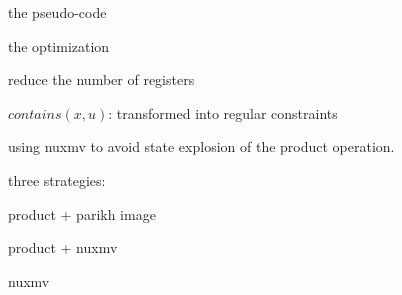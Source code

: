 
the pseudo-code

the optimization

reduce the number of registers

$contains(x, u)$: transformed into regular constraints

using nuxmv to avoid state explosion of the product operation.

three strategies: 

product + parikh image

product + nuxmv

nuxmv


